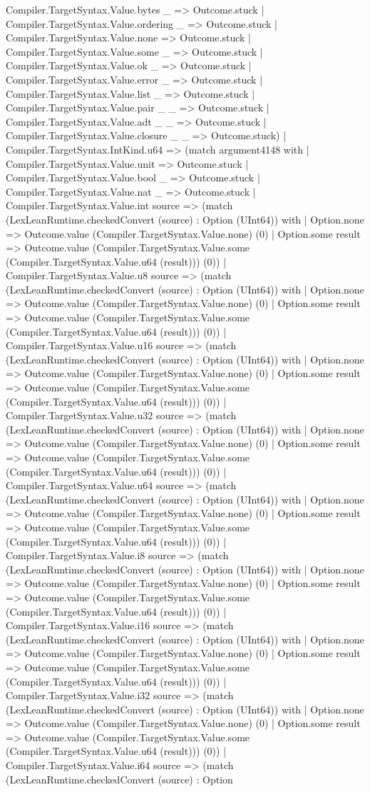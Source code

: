 \documentclass[11pt]{article}
\begin{document}
Compiler.TargetSyntax.Value.bytes \_ => Outcome.stuck | Compiler.TargetSyntax.Value.ordering \_ => Outcome.stuck | Compiler.TargetSyntax.Value.none => Outcome.stuck | Compiler.TargetSyntax.Value.some \_ => Outcome.stuck | Compiler.TargetSyntax.Value.ok \_ => Outcome.stuck | Compiler.TargetSyntax.Value.error \_ => Outcome.stuck | Compiler.TargetSyntax.Value.list \_ => Outcome.stuck | Compiler.TargetSyntax.Value.pair \_ \_ => Outcome.stuck | Compiler.TargetSyntax.Value.adt \_ \_ => Outcome.stuck | Compiler.TargetSyntax.Value.closure \_ \_ => Outcome.stuck) | Compiler.TargetSyntax.IntKind.u64 => (match argument4148 with | Compiler.TargetSyntax.Value.unit => Outcome.stuck | Compiler.TargetSyntax.Value.bool \_ => Outcome.stuck | Compiler.TargetSyntax.Value.nat \_ => Outcome.stuck | Compiler.TargetSyntax.Value.int source => (match (LexLeanRuntime.checkedConvert (source) : Option (UInt64)) with | Option.none => Outcome.value (Compiler.TargetSyntax.Value.none) (0) | Option.some result => Outcome.value (Compiler.TargetSyntax.Value.some (Compiler.TargetSyntax.Value.u64 (result))) (0)) | Compiler.TargetSyntax.Value.u8 source => (match (LexLeanRuntime.checkedConvert (source) : Option (UInt64)) with | Option.none => Outcome.value (Compiler.TargetSyntax.Value.none) (0) | Option.some result => Outcome.value (Compiler.TargetSyntax.Value.some (Compiler.TargetSyntax.Value.u64 (result))) (0)) | Compiler.TargetSyntax.Value.u16 source => (match (LexLeanRuntime.checkedConvert (source) : Option (UInt64)) with | Option.none => Outcome.value (Compiler.TargetSyntax.Value.none) (0) | Option.some result => Outcome.value (Compiler.TargetSyntax.Value.some (Compiler.TargetSyntax.Value.u64 (result))) (0)) | Compiler.TargetSyntax.Value.u32 source => (match (LexLeanRuntime.checkedConvert (source) : Option (UInt64)) with | Option.none => Outcome.value (Compiler.TargetSyntax.Value.none) (0) | Option.some result => Outcome.value (Compiler.TargetSyntax.Value.some (Compiler.TargetSyntax.Value.u64 (result))) (0)) | Compiler.TargetSyntax.Value.u64 source => (match (LexLeanRuntime.checkedConvert (source) : Option (UInt64)) with | Option.none => Outcome.value (Compiler.TargetSyntax.Value.none) (0) | Option.some result => Outcome.value (Compiler.TargetSyntax.Value.some (Compiler.TargetSyntax.Value.u64 (result))) (0)) | Compiler.TargetSyntax.Value.i8 source => (match (LexLeanRuntime.checkedConvert (source) : Option (UInt64)) with | Option.none => Outcome.value (Compiler.TargetSyntax.Value.none) (0) | Option.some result => Outcome.value (Compiler.TargetSyntax.Value.some (Compiler.TargetSyntax.Value.u64 (result))) (0)) | Compiler.TargetSyntax.Value.i16 source => (match (LexLeanRuntime.checkedConvert (source) : Option (UInt64)) with | Option.none => Outcome.value (Compiler.TargetSyntax.Value.none) (0) | Option.some result => Outcome.value (Compiler.TargetSyntax.Value.some (Compiler.TargetSyntax.Value.u64 (result))) (0)) | Compiler.TargetSyntax.Value.i32 source => (match (LexLeanRuntime.checkedConvert (source) : Option (UInt64)) with | Option.none => Outcome.value (Compiler.TargetSyntax.Value.none) (0) | Option.some result => Outcome.value (Compiler.TargetSyntax.Value.some (Compiler.TargetSyntax.Value.u64 (result))) (0)) | Compiler.TargetSyntax.Value.i64 source => (match (LexLeanRuntime.checkedConvert (source) : Option 
\end{document}
